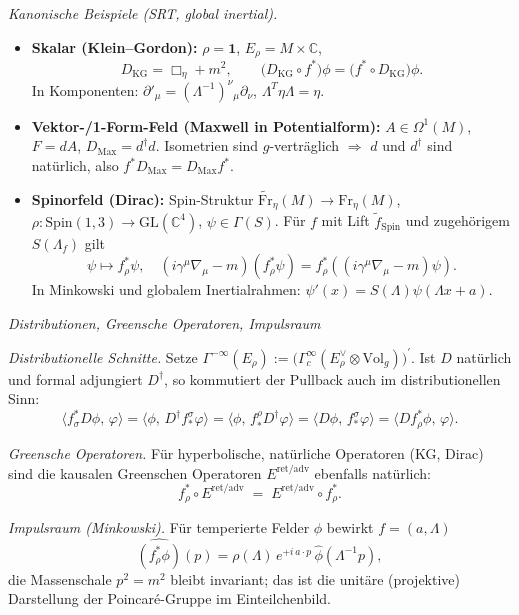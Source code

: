 \documentclass[10pt, letterpaper]{article}
\newcommand{\C}{\mathbb{C}}
\newcommand{\GL}{\mathrm{GL}}
\newcommand{\Spin}{\mathrm{Spin}}
\begin{document}
\emph{Kanonische Beispiele (SRT, global inertial).}
\begin{itemize}
\item \textbf{Skalar (Klein–Gordon):} $\rho=\mathbf{1}$, $E_\rho=M\times\C$,
\[
D_{\mathrm{KG}}=\Box_\eta+m^2,\qquad
\big(D_{\mathrm{KG}}\circ f^*\big)\phi=\big(f^*\circ D_{\mathrm{KG}}\big)\phi.
\]
In Komponenten: $\partial'_\mu=(\Lambda^{-1})^\nu{}_\mu\partial_\nu$, $\Lambda^T\eta\Lambda=\eta$.

\item \textbf{Vektor-/1-Form-Feld (Maxwell in Potentialform):}
$A\in\Omega^1(M)$, $F=dA$, $D_{\mathrm{Max}}=d^\dagger d$.
Isometrien sind $g$-verträglich $\Rightarrow$ $d$ und $d^\dagger$ sind natürlich,
also $f^* D_{\mathrm{Max}}=D_{\mathrm{Max}} f^*$.

\item \textbf{Spinorfeld (Dirac):}
Spin-Struktur $\widetilde{\mathrm{Fr}}_\eta(M)\to\mathrm{Fr}_\eta(M)$,
$\rho:\Spin(1,3)\to\GL(\C^4)$, $\psi\in\Gamma(S)$.
Für $f$ mit Lift $\tilde f_{\Spin}$ und zugehörigem $S(\Lambda_f)$ gilt
\[
\psi\mapsto f^*_\rho\psi,\quad
(i\gamma^\mu\nabla_\mu-m)(f^*_\rho\psi)=f_\rho^*((i\gamma^\mu\nabla_\mu-m)\psi).
\]
In Minkowski und globalem Inertialrahmen: $\psi'(x)=S(\Lambda)\psi(\Lambda x+a)$.
\end{itemize}

\emph{Distributionen, Greensche Operatoren, Impulsraum}

\emph{Distributionelle Schnitte.}
Setze $\Gamma^{-\infty}(E_\rho):=\big(\Gamma_c^\infty(E_\rho^\vee\otimes\mathrm{Vol}_g)\big)^\prime$.
Ist $D$ natürlich und formal adjungiert $\!D^\dagger$, so kommutiert der Pullback auch im distributionellen Sinn:
\[
\langle f^*_\sigma D\phi,\,\varphi\rangle
=\langle \phi,\, D^\dagger f_*^\sigma\varphi\rangle
=\langle \phi,\, f_*^\rho D^\dagger\varphi\rangle
=\langle D\phi,\, f_*^\sigma\varphi\rangle
=\langle D f^*_\rho\phi,\,\varphi\rangle.
\]

\emph{Greensche Operatoren.}
Für hyperbolische, natürliche Operatoren (KG, Dirac) sind die kausalen Greenschen Operatoren
$E^{\mathrm{ret/adv}}$ ebenfalls natürlich:
\[
f^*_\rho\circ E^{\mathrm{ret/adv}} \;=\; E^{\mathrm{ret/adv}}\circ f^*_\rho.
\]

\emph{Impulsraum (Minkowski).}
Für temperierte Felder $\phi$ bewirkt $f=(a,\Lambda)$
\[
\widehat{(f^*_\rho\phi)}(p)=\rho(\Lambda)\,e^{+i\,a\cdot p}\,\hat\phi(\Lambda^{-1}p),
\]
die Massenschale $p^2=m^2$ bleibt invariant; das ist die unitäre (projektive) Darstellung der Poincaré-Gruppe
im Einteilchenbild.
\end{document}
